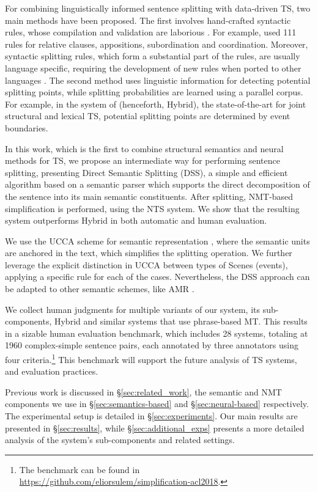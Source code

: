 \documentclass[11pt,a4paper]{article}
\begin{document}
For combining linguistically informed sentence splitting with data-driven TS, two main methods have been proposed.
The first  involves hand-crafted syntactic rules, whose compilation and validation are laborious \citep{Sh14}. For example, \citet{SA14} used 111 rules for relative clauses, appositions, subordination and coordination. Moreover, syntactic splitting rules, which form a substantial part of the rules, are usually language specific, requiring the development of new rules when ported to other languages \citep[for Portuguese, French, Vietnamese, and Italian respectively]{AG10,S12,H12,BT13}.
The second method uses linguistic information for detecting potential splitting points, while splitting probabilities are learned using a parallel corpus. For example, in the system of \citet{NG14} (henceforth, {\sc Hybrid}), the state-of-the-art for joint structural and lexical TS, potential splitting points are determined by event boundaries. 

In this work, which is the first to combine structural semantics and neural methods for TS, we propose an intermediate way for performing sentence splitting, presenting Direct Semantic Splitting (DSS), a simple and efficient algorithm based on a semantic parser which supports the direct decomposition of the sentence into its main semantic constituents. 
After splitting, NMT-based simplification is performed, using the NTS system. We show that the resulting system outperforms {\sc Hybrid} in both automatic and human evaluation.

We use the UCCA scheme for semantic representation \citep{AR13}, where the semantic units are anchored in the text, 
which simplifies the splitting operation.
We further leverage the explicit distinction in UCCA between types of Scenes (events), applying a specific rule for each of the cases. 
Nevertheless, the DSS approach can be adapted to other semantic schemes,
like AMR \citep{Ba13}. 

We collect human judgments for multiple variants of our system, its sub-components, {\sc Hybrid} and similar systems that use phrase-based MT.
This results in a sizable human evaluation benchmark, which includes 28 systems, totaling at 1960 complex-simple sentence pairs, 
each annotated by three annotators using four criteria.\footnote{The benchmark can be found in \url{https://github.com/eliorsulem/simplification-acl2018}.}
This benchmark will support the future analysis of TS systems, and evaluation practices.

Previous work is discussed in \S\ref{sec:related_work},
the semantic and NMT components we use in  \S\ref{sec:semantics-based} and \S\ref{sec:neural-based} respectively. 
The experimental setup is detailed in \S\ref{sec:experiments}.
Our main results are presented in \S\ref{sec:results}, while \S\ref{sec:additional_exps} presents a more detailed analysis of the system's sub-components and related settings.
\end{document}
